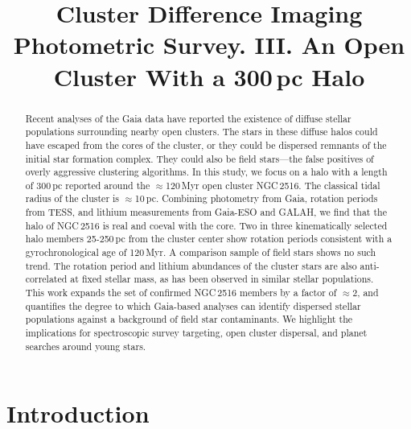 \documentclass[12pt,twocolumn,tighten]{aastex63}
\begin{document}

\title{
  Cluster Difference Imaging Photometric Survey. III.
  An Open Cluster With a 300\,pc Halo
}



\begin{abstract}
  Recent analyses of the Gaia data have reported the existence of
  diffuse stellar populations surrounding nearby open clusters. 
  The stars in these diffuse halos could have escaped from the cores of the
  cluster, or they could be dispersed remnants of the initial star formation complex.
  They could also be field stars---the false positives of overly
  aggressive clustering algorithms.
  In this study, we focus on a halo with a length of 300\,pc reported
  around the $\approx$120\,Myr open cluster NGC\,2516.
  The classical tidal radius of the cluster is $\approx$10\,pc.
  Combining photometry from Gaia, rotation periods from TESS, and
  lithium measurements from Gaia-ESO and GALAH, we find that the halo
  of NGC\,2516 is real and coeval with the core.
  Two in three kinematically selected halo members 25-250\,pc from the
  cluster center show rotation periods consistent with a
  gyrochronological age of 120\,Myr.
  A comparison sample of field stars shows no such trend.
  The rotation period and lithium abundances of the cluster stars are
  also anti-correlated at fixed stellar mass, as has been observed in
  similar stellar populations.
  This work expands the set of confirmed NGC\,2516 members by a factor
  of $\approx$2, and quantifies the degree to which Gaia-based
  analyses can identify dispersed stellar populations against a
  background of field star contaminants.
  We highlight the implications for spectroscopic survey targeting,
  open cluster dispersal, and planet searches around young stars.
\end{abstract}





\section{Introduction}
\end{document}

